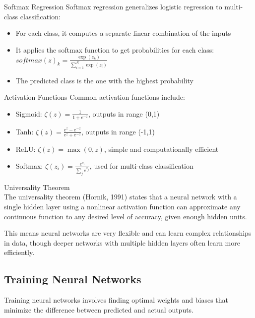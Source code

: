 \begin{definition}{Softmax Regression}
Softmax regression generalizes logistic regression to multi-class classification:
\begin{itemize}
    \item For each class, it computes a separate linear combination of the inputs
    \item It applies the softmax function to get probabilities for each class: $softmax(z)_k = \frac{\exp(z_k)}{\sum_{i=1}^{K} \exp(z_i)}$
    \item The predicted class is the one with the highest probability
\end{itemize}
\end{definition}

\begin{definition}{Activation Functions}
Common activation functions include:
\begin{itemize}
    \item Sigmoid: $\zeta(z) = \frac{1}{1 + e^{-z}}$, outputs in range (0,1)
    \item Tanh: $\zeta(z) = \frac{e^z - e^{-z}}{e^z + e^{-z}}$, outputs in range (-1,1)
    \item ReLU: $\zeta(z) = \max(0, z)$, simple and computationally efficient
    \item Softmax: $\zeta(z_i) = \frac{e^{z_i}}{\sum_{j} e^{z_j}}$, used for multi-class classification
\end{itemize}
\end{definition}

\begin{concept}{Universality Theorem}\\ \small
The universality theorem (Hornik, 1991) states that a neural network with a single hidden layer using a nonlinear activation function can approximate any continuous function to any desired level of accuracy, given enough hidden units.

This means neural networks are very flexible and can learn complex relationships in data, though deeper networks with multiple hidden layers often learn more efficiently.
\end{concept}

\subsection{Training Neural Networks}

Training neural networks involves finding optimal weights and biases that minimize the difference between predicted and actual outputs.

